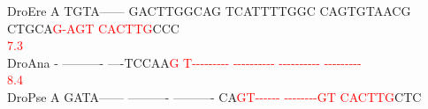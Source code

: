 \documentclass[11pt,twoside,reqno,a4paper]{article}
\begin{document}
{DroEre	A	TGTA------	GACTTGGCAG	TCATTTTGGC	CAGTGTAACG	CTGCA\textcolor{Red}{G}\textcolor{Red}{-}\textcolor{Red}{A}\textcolor{Red}{G}\textcolor{Red}{T}	\textcolor{Red}{C}\textcolor{Red}{A}\textcolor{Red}{C}\textcolor{Red}{T}\textcolor{Red}{T}\textcolor{Red}{G}CCC\\
\hspace*{7\charwidth}\hspace*{1\charwidth}\hspace*{1\charwidth}\hspace*{1\charwidth}\hspace*{1\charwidth}\hspace*{1\charwidth}\hspace*{46\charwidth}\textcolor{Red}{7.3}\hspace*{1\charwidth}\\
DroAna	-	----------	----TCCAA\textcolor{Red}{G}	\textcolor{Red}{T}\textcolor{Red}{-}\textcolor{Red}{-}\textcolor{Red}{-}\textcolor{Red}{-}\textcolor{Red}{-}\textcolor{Red}{-}\textcolor{Red}{-}\textcolor{Red}{-}\textcolor{Red}{-}	\textcolor{Red}{-}\textcolor{Red}{-}\textcolor{Red}{-}\textcolor{Red}{-}\textcolor{Red}{-}\textcolor{Red}{-}\textcolor{Red}{-}\textcolor{Red}{-}\textcolor{Red}{-}\textcolor{Red}{-}	\textcolor{Red}{-}\textcolor{Red}{-}\textcolor{Red}{-}\textcolor{Red}{-}\textcolor{Red}{-}\textcolor{Red}{-}\textcolor{Red}{-}\textcolor{Red}{-}\textcolor{Red}{-}\textcolor{Red}{-}	\textcolor{Red}{-}\textcolor{Red}{-}\textcolor{Red}{-}\textcolor{Red}{-}\textcolor{Red}{-}\textcolor{Red}{-}\textcolor{Red}{-}\textcolor{Red}{-}\textcolor{Red}{-}\\
\hspace*{7\charwidth}\hspace*{1\charwidth}\hspace*{1\charwidth}\hspace*{20\charwidth}\textcolor{Red}{8.4}\hspace*{1\charwidth}\hspace*{1\charwidth}\hspace*{1\charwidth}\hspace*{1\charwidth}\\
DroPse	A	GATA------	----------	----------	CA\textcolor{Red}{G}\textcolor{Red}{T}\textcolor{Red}{-}\textcolor{Red}{-}\textcolor{Red}{-}\textcolor{Red}{-}\textcolor{Red}{-}\textcolor{Red}{-}	\textcolor{Red}{-}\textcolor{Red}{-}\textcolor{Red}{-}\textcolor{Red}{-}\textcolor{Red}{-}\textcolor{Red}{-}\textcolor{Red}{-}\textcolor{Red}{-}\textcolor{Red}{G}\textcolor{Red}{T}	\textcolor{Red}{C}\textcolor{Red}{A}\textcolor{Red}{C}\textcolor{Red}{T}\textcolor{Red}{T}\textcolor{Red}{G}CTC\\
}
\end{document}
